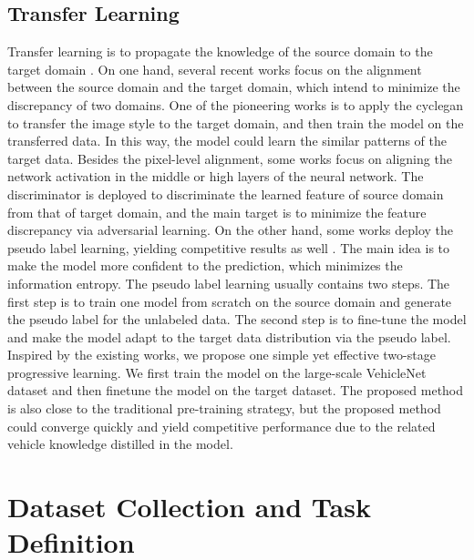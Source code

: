 \documentclass[journal]{IEEEtran}
\begin{document}
\subsection{Transfer Learning}
Transfer learning is to propagate the knowledge of the source domain to the target domain \cite{pan2009survey}. On one hand, several recent works focus on the alignment between the source domain and the target domain, which intend to minimize the discrepancy of two domains. One of the pioneering works \cite{hoffman2017cycada} is to apply the cyclegan \cite{zhu2017toward} to transfer the image style to the target domain, and then train the model on the transferred data. In this way, the model could learn the similar patterns of the target data. Besides the pixel-level alignment, some works \cite{tsai2018learning,tsai2019domain,luo2019taking} focus on aligning the network activation in the middle or high layers of the neural network. The discriminator is deployed to discriminate the learned feature of source domain from that of target domain, and the main target is to minimize the feature discrepancy via adversarial learning. On the other hand, some works deploy the pseudo label learning, yielding competitive results as well \cite{zou2018unsupervised,lee2018diverse}. The main idea is to make the model more confident to the prediction, which minimizes the information entropy. The pseudo label learning usually contains two steps. The first step is to train one model from scratch on the source domain and generate the pseudo label for the unlabeled data. The second step is to fine-tune the model and make the model adapt to the target data distribution via the pseudo label. Inspired by the existing works, we propose one simple yet  effective two-stage progressive learning. We first train the model on the large-scale VehicleNet dataset and then finetune the model on the target dataset. The proposed method is also close to the traditional pre-training strategy, but the proposed method could converge quickly and yield competitive performance due to the related vehicle knowledge distilled in the model.

\section{Dataset Collection and Task Definition} \label{sec:datasetcollection}
\end{document}
